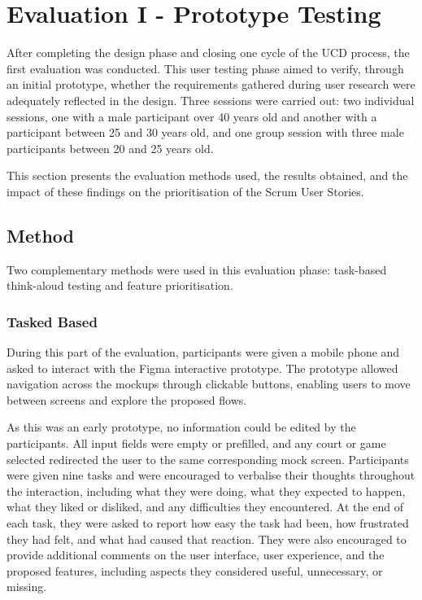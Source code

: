 \section{Evaluation I - Prototype Testing}
\label{sec:rp-eval1}

After completing the design phase and closing one cycle of the UCD process, the first evaluation was conducted. 
This user testing phase aimed to verify, through an initial prototype, whether the requirements gathered during user research were adequately reflected in the design. 
Three sessions were carried out: two individual sessions, one with a male participant over 40 years old and another with a participant between 25 and 30 years old, and one group session with three male participants between 20 and 25 years old.

This section presents the evaluation methods used, the results obtained, and the impact of these findings on the prioritisation of the Scrum User Stories.


\subsection{Method}
\label{subsec:rp-eval1-method}

Two complementary methods were used in this evaluation phase: task-based think-aloud testing and feature prioritisation.



\subsubsection{Tasked Based}
\label{subsubsec:method-task}

During this part of the evaluation, participants were given a mobile phone and asked to interact with the Figma interactive prototype. 
The prototype allowed navigation across the mockups through clickable buttons, enabling users to move between screens and explore the proposed flows.

As this was an early prototype, no information could be edited by the participants. 
All input fields were empty or prefilled, and any court or game selected redirected the user to the same corresponding mock screen. 
Participants were given nine tasks and were encouraged to verbalise their thoughts throughout the interaction, including what they were doing, what they expected to happen, what they liked or disliked, and any difficulties they encountered. 
At the end of each task, they were asked to report how easy the task had been, how frustrated they had felt, and what had caused that reaction.
They were also encouraged to provide additional comments on the user interface, user experience, and the proposed features, including aspects they considered useful, unnecessary, or missing.

